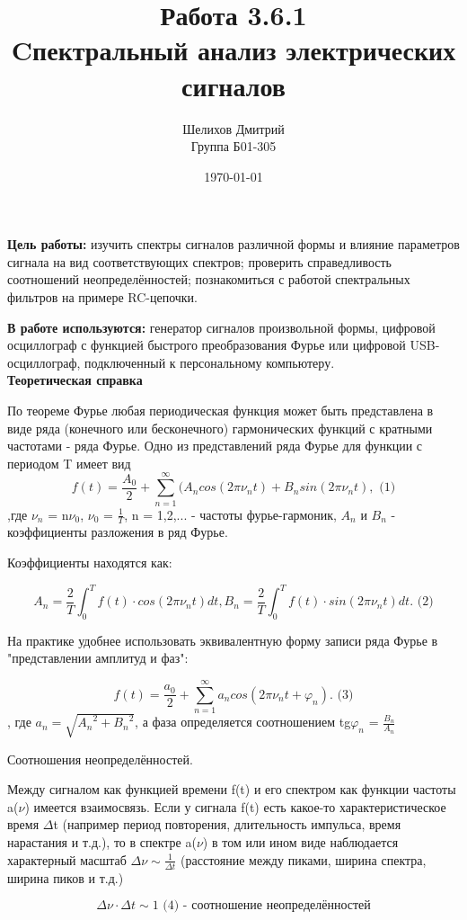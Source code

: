 \documentclass[a4paper,12pt]{article}
\author{Шелихов Дмитрий\\Группа Б01-305}
\title{\textbf{Работа 3.6.1\\Cпектральный анализ электрических сигналов}}
\date{\today}
\begin{document}
 

\maketitle

\textbf{Цель работы:} изучить спектры сигналов различной формы и влияние параметров сигнала на вид соответствующих спектров; проверить справедливость соотношений неопределённостей; познакомиться с работой спектральных фильтров на примере RC-цепочки. \\
\par
\textbf{В работе используются:} генератор сигналов произвольной формы, цифровой осциллограф с функцией быстрого преобразования Фурье или цифровой USB-осциллограф, подключенный к персональному компьютеру.\\
\noindent\textbf{Теоретическая справка}

По теореме Фурье любая периодическая функция может быть представлена в виде ряда (конечного или бесконечного) гармонических функций с кратными частотами - ряда Фурье. Одно из представлений ряда Фурье для функции с периодом T имеет вид
$$ f(t) = \frac{A_0}{2} + \sum_{n=1}^\infty(A_ncos(2\pi\nu_nt) + B_nsin(2\pi\nu_nt), \text{ (1)} $$
,где $\nu_n$ = n$\nu_0$, $\nu_0$ = $\frac{1}{T}$, n = 1,2,... - частоты фурье-гармоник, $A_n$ и $B_n$ - коэффициенты разложения в ряд Фурье.

Коэффициенты находятся как:

$$A_n = \frac{2}{T}\int_0^Tf(t)\cdot cos(2\pi\nu_nt)dt, B_n = \frac{2}{T}\int_0^Tf(t)\cdot sin(2\pi\nu_nt)dt. \text{ (2)}$$

На практике удобнее использовать эквивалентную форму записи ряда Фурье в "представлении амплитуд и фаз":

$$ f(t) = \frac{a_0}{2} + \sum_{n=1}^\infty a_ncos(2\pi\nu_nt+\varphi_n). \text{ (3)} $$, где $a_n = \sqrt{{A_n}^2 + {B_n}^2}$, а фаза определяется соотношением tg$\varphi_n$ = $\frac{B_n}{A_n}$

Соотношения неопределённостей.

Между сигналом как функцией времени f(t) и его спектром как функции частоты a($\nu$) имеется взаимосвязь. Если у сигнала f(t) есть какое-то характеристическое время $\Delta$t (например период повторения, длительность импульса, время нарастания и т.д.), то в спектре a($\nu$) в том или ином виде наблюдается характерный масштаб $\Delta\nu \sim \frac{1}{\Delta t}$ (расстояние между пиками, ширина спектра, ширина пиков и т.д.)

$$ \Delta\nu \cdot \Delta t \sim 1 \text{ (4) - соотношение неопределённостей} $$
\end{document}
